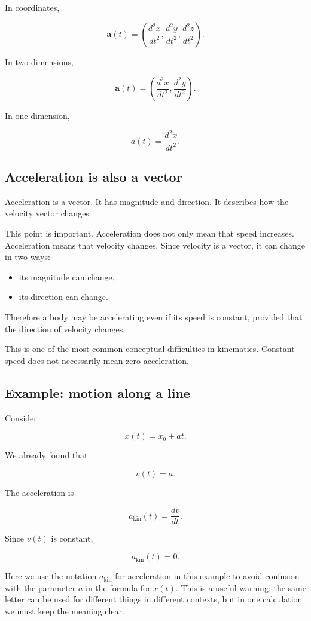 In coordinates,

\[
\mathbf{a}(t)
=
\left(
\frac{d^2x}{dt^2},
\frac{d^2y}{dt^2},
\frac{d^2z}{dt^2}
\right).
\]

In two dimensions,

\[
\mathbf{a}(t)
=
\left(
\frac{d^2x}{dt^2},
\frac{d^2y}{dt^2}
\right).
\]

In one dimension,

\[
a(t)=\frac{d^2x}{dt^2}.
\]

\subsection{Acceleration is also a vector}

Acceleration is a vector. It has magnitude and direction. It describes how the velocity vector changes.

This point is important. Acceleration does not only mean that speed increases. Acceleration means that velocity changes. Since velocity is a vector, it can change in two ways:

\begin{itemize}
    \item its magnitude can change,
    \item its direction can change.
\end{itemize}

Therefore a body may be accelerating even if its speed is constant, provided that the direction of velocity changes.

This is one of the most common conceptual difficulties in kinematics. Constant speed does not necessarily mean zero acceleration.

\subsection{Example: motion along a line}

Consider

\[
x(t)=x_0+at.
\]

We already found that

\[
v(t)=a.
\]

The acceleration is

\[
a_{\mathrm{kin}}(t)=\frac{dv}{dt}.
\]

Since \(v(t)\) is constant,

\[
a_{\mathrm{kin}}(t)=0.
\]

Here we use the notation \(a_{\mathrm{kin}}\) for acceleration in this example to avoid confusion with the parameter \(a\) in the formula for \(x(t)\). This is a useful warning: the same letter can be used for different things in different contexts, but in one calculation we must keep the meaning clear.

